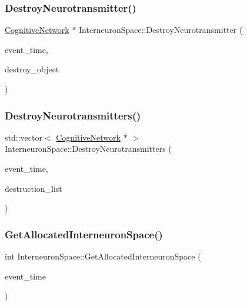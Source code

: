 \subsubsection{\texorpdfstring{Destroy\+Neurotransmitter()}{DestroyNeurotransmitter()}}
{\footnotesize\ttfamily \mbox{\hyperlink{classCognitiveNetwork}{Cognitive\+Network}} $\ast$ Interneuron\+Space\+::\+Destroy\+Neurotransmitter (\begin{DoxyParamCaption}\item[{std\+::chrono\+::time\+\_\+point$<$ \mbox{\hyperlink{universe_8h_a0ef8d951d1ca5ab3cfaf7ab4c7a6fd80}{Clock}} $>$}]{event\+\_\+time,  }\item[{\mbox{\hyperlink{classCognitiveNetwork}{Cognitive\+Network}} $\ast$}]{destroy\+\_\+object }\end{DoxyParamCaption})}

\mbox{\label{classInterneuronSpace_a9543932ffea18cce46fdfbf0fbb85b1b}} 
\subsubsection{\texorpdfstring{Destroy\+Neurotransmitters()}{DestroyNeurotransmitters()}}
{\footnotesize\ttfamily std\+::vector$<$ \mbox{\hyperlink{classCognitiveNetwork}{Cognitive\+Network}} $\ast$ $>$ Interneuron\+Space\+::\+Destroy\+Neurotransmitters (\begin{DoxyParamCaption}\item[{std\+::chrono\+::time\+\_\+point$<$ \mbox{\hyperlink{universe_8h_a0ef8d951d1ca5ab3cfaf7ab4c7a6fd80}{Clock}} $>$}]{event\+\_\+time,  }\item[{std\+::vector$<$ \mbox{\hyperlink{classCognitiveNetwork}{Cognitive\+Network}} $\ast$$>$}]{destruction\+\_\+list }\end{DoxyParamCaption})}

\mbox{\label{classInterneuronSpace_a4b053dc94a921c8176d9f58d40169089}} 
\subsubsection{\texorpdfstring{Get\+Allocated\+Interneuron\+Space()}{GetAllocatedInterneuronSpace()}}
{\footnotesize\ttfamily int Interneuron\+Space\+::\+Get\+Allocated\+Interneuron\+Space (\begin{DoxyParamCaption}\item[{std\+::chrono\+::time\+\_\+point$<$ \mbox{\hyperlink{universe_8h_a0ef8d951d1ca5ab3cfaf7ab4c7a6fd80}{Clock}} $>$}]{event\+\_\+time }\end{DoxyParamCaption})}

